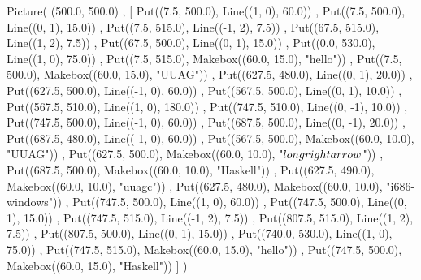 Picture(
  (500.0, 500.0)
, [ Put((7.5, 500.0), Line((1, 0), 60.0))
  , Put((7.5, 500.0), Line((0, 1), 15.0))
  , Put((7.5, 515.0), Line((-1, 2), 7.5))
  , Put((67.5, 515.0), Line((1, 2), 7.5))
  , Put((67.5, 500.0), Line((0, 1), 15.0))
  , Put((0.0, 530.0), Line((1, 0), 75.0))
  , Put((7.5, 515.0), Makebox((60.0, 15.0), "hello"))
  , Put((7.5, 500.0), Makebox((60.0, 15.0), "UUAG"))
  , Put((627.5, 480.0), Line((0, 1), 20.0))
  , Put((627.5, 500.0), Line((-1, 0), 60.0))
  , Put((567.5, 500.0), Line((0, 1), 10.0))
  , Put((567.5, 510.0), Line((1, 0), 180.0))
  , Put((747.5, 510.0), Line((0, -1), 10.0))
  , Put((747.5, 500.0), Line((-1, 0), 60.0))
  , Put((687.5, 500.0), Line((0, -1), 20.0))
  , Put((687.5, 480.0), Line((-1, 0), 60.0))
  , Put((567.5, 500.0), Makebox((60.0, 10.0), "UUAG"))
  , Put((627.5, 500.0), Makebox((60.0, 10.0), "$\\longrightarrow$"))
  , Put((687.5, 500.0), Makebox((60.0, 10.0), "Haskell"))
  , Put((627.5, 490.0), Makebox((60.0, 10.0), "uuagc"))
  , Put((627.5, 480.0), Makebox((60.0, 10.0), "i686-windows"))
  , Put((747.5, 500.0), Line((1, 0), 60.0))
  , Put((747.5, 500.0), Line((0, 1), 15.0))
  , Put((747.5, 515.0), Line((-1, 2), 7.5))
  , Put((807.5, 515.0), Line((1, 2), 7.5))
  , Put((807.5, 500.0), Line((0, 1), 15.0))
  , Put((740.0, 530.0), Line((1, 0), 75.0))
  , Put((747.5, 515.0), Makebox((60.0, 15.0), "hello"))
  , Put((747.5, 500.0), Makebox((60.0, 15.0), "Haskell"))
  ]
)
